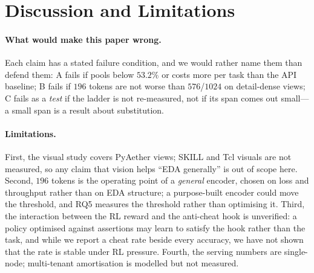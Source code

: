 ﻿\section{Discussion and Limitations}\label{sec:discussion}

\paragraph{What would make this paper wrong.}
Each claim has a stated failure condition, and we would rather name them than defend them: A fails if \llm pools below $53.2\%$ or costs more per task than the API baseline; B fails if $196$ tokens are not worse than $576$/$1024$ on detail-dense views; C fails as a \emph{test} if the ladder is not re-measured, not if its span comes out small---a small span is a result about substitution.

\paragraph{Limitations.}
First, the visual study covers PyAether views; SKILL and Tcl visuals are not measured, so any claim that vision helps ``EDA generally'' is out of scope here.
Second, $196$ tokens is the operating point of a \emph{general} encoder, chosen on loss and throughput rather than on EDA structure; a purpose-built encoder could move the threshold, and RQ5 measures the threshold rather than optimising it.
Third, the interaction between the RL reward and the anti-cheat hook is unverified: a policy optimised against assertions may learn to satisfy the hook rather than the task, and while we report a cheat rate beside every accuracy, we have not shown that the rate is stable under RL pressure.
Fourth, the serving numbers are single-node; multi-tenant amortisation is modelled but not measured.

